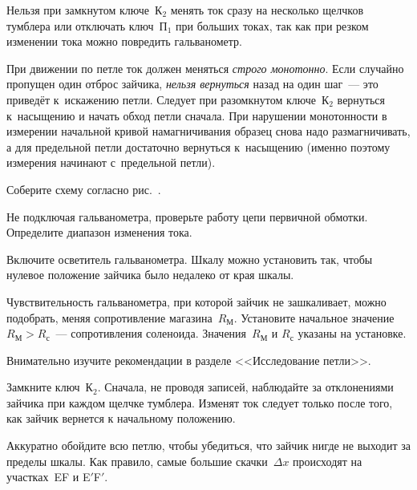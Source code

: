 Нельзя при замкнутом ключе~К$_2$ менять ток сразу на несколько щелчков тумблера или
отключать ключ~$\text{П}_1$ при больших токах, так как при резком изменении
тока можно повредить гальванометр.

При движении по петле ток должен меняться \emph{строго монотонно}.
Если случайно пропущен один отброс зайчика, \emph{нельзя вернуться}
назад на один шаг~--- это приведёт к~искажению петли. Следует при разомкнутом
ключе~К$_2$ вернуться к~насыщению и начать обход петли сначала. 
При нарушении монотонности в измерении начальной кривой
намагничивания образец снова надо размагничивать, а для предельной петли
достаточно вернуться к~насыщению (именно поэтому измерения начинают с~предельной
петли).

\begin{lab:task}



	\item Соберите схему согласно рис.~.

	\item Не подключая гальванометра, проверьте работу цепи первичной обмотки.
Определите диапазон изменения тока.

	\item Включите осветитель гальванометра. Шкалу можно установить так, чтобы нулевое
    положение зайчика было недалеко от края шкалы.
    
    Чувствительность гальванометра, при которой зайчик не зашкаливает,
можно подобрать, меняя сопротивление магазина~$R_{М}$. Установите начальное значение~$R_М>R_{с}$~--- сопротивления
соленоида. Значения~$R_{М}$ и $R_{с}$ указаны на установке.

	
	\begin{lab:warning}
		Внимательно изучите рекомендации в разделе <<Исследование петли>>.
	\end{lab:warning}

	\item Замкните ключ~К$_2$. Сначала, не проводя записей, наблюдайте за
отклонениями зайчика при каждом щелчке тумблера. Изменят ток следует только
после того, как зайчик вернется к начальному положению.

	Аккуратно обойдите всю петлю, чтобы убедиться, что зайчик нигде не выходит
за пределы шкалы. Как правило, самые большие скачки~$\Delta x$ происходят 
на участках~EF и E$'$F$'$.


\end{lab:task}
